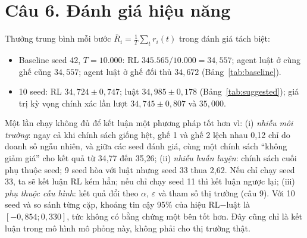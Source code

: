 \documentclass[12pt,a4paper]{report}
\begin{document}
\section*{Câu 6. Đánh giá hiệu năng}
Thưởng trung bình mỗi bước $\bar R_i=\frac1T\sum_t r_i(t)$ trong đánh giá tách biệt:
\begin{itemize}
\item Baseline seed 42, $T=10.000$: RL $345.565/10.000=34{,}557$; agent luật ở cùng
  ghế cũng $34{,}557$; agent luật ở ghế đối thủ $34{,}672$ (Bảng~\ref{tab:baseline}).
\item 10 seed: RL $34{,}724\pm0{,}747$; luật $34{,}985\pm0{,}178$
  (Bảng~\ref{tab:suggested}); giá trị kỳ vọng chính xác lần lượt
  $34{,}745\pm0{,}807$ và $35{,}000$.
\end{itemize}
Một lần chạy không đủ để kết luận một phương pháp tốt hơn vì:
(i) \emph{nhiễu môi trường}: ngay cả khi chính sách giống hệt, ghế 1 và ghế 2 lệch
nhau 0{,}12 chỉ do doanh số ngẫu nhiên, và giữa các seed đánh giá, cùng một chính
sách ``không giảm giá'' cho kết quả từ 34{,}77 đến 35{,}26;
(ii) \emph{nhiễu huấn luyện}: chính sách cuối phụ thuộc seed; 9 seed hòa với luật
nhưng seed 33 thua 2{,}62. Nếu chỉ chạy seed 33, ta sẽ kết luận RL kém hẳn; nếu chỉ
chạy seed 11 thì kết luận ngược lại; (iii) \emph{phụ thuộc cấu hình}: kết quả đổi theo
$\alpha$, $\varepsilon$ và tham số thị trường (câu 9). Với 10 seed và so sánh từng
cặp, khoảng tin cậy 95\% của hiệu RL$-$luật là $[-0{,}854;0{,}330]$, tức không có
bằng chứng một bên tốt hơn. Đây cũng chỉ là kết luận trong mô hình mô phỏng này,
không phải cho thị trường thật.

\end{document}
